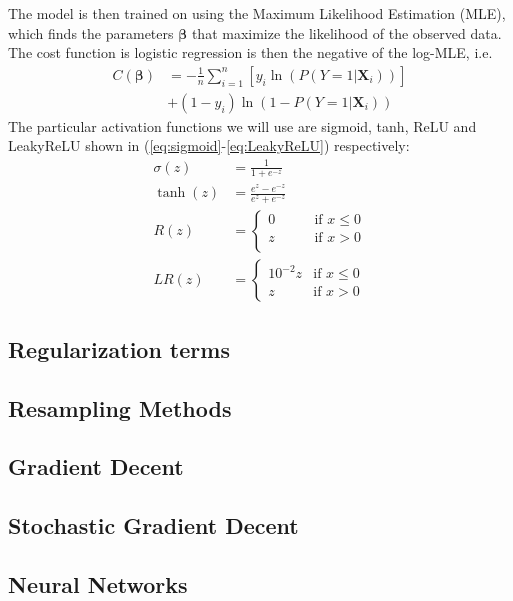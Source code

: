 \documentclass[%
reprint,
amsmath,amssymb,
aps,
]{revtex4-2}
\begin{document}
The model is then trained on using the Maximum Likelihood Estimation (MLE), which finds the parameters $\bm\beta$ that maximize the likelihood of the observed data. The cost function is logistic regression is then the negative of the log-MLE, i.e.
\begin{align}
	C(\bm\beta)&=-\frac{1}{n}\sum_{i=1}^n[y_i\ln(P(Y=1|\bm X_i))]\\
	&+(1-y_i)\ln(1-P(Y=1|\bm X_i))
\end{align}
The particular activation functions we will use are sigmoid, tanh, ReLU and LeakyReLU shown in (\ref{eq:sigmoid}-\ref{eq:LeakyReLU}) respectively:
\begin{align}
	\label{eq:sigmoid}
	\sigma(z)&=\frac{1}{1+e^{-z}}\\
	\label{eq:tanh}
	\tanh(z)&=\frac{e^z-e^{-z}}{e^z+e^{-z}}\\
	\label{eq:ReLU}
	R(z)&=\begin{cases}
		0 &\qquad\text{if }x\leq0\\
		z &\qquad\text{if }x>0\\
	\end{cases}\\
	\label{eq:LeakyReLU}
	LR(z)&=\begin{cases}
		10^{-2}z&\text{if }x\leq0\\
		z &\text{if }x>0
	\end{cases}
\end{align}

\subsection{Regularization terms}

\subsection{Resampling Methods}

\subsection{Gradient Decent}

\subsection{Stochastic Gradient Decent}

\subsection{Neural Networks}
\end{document}
